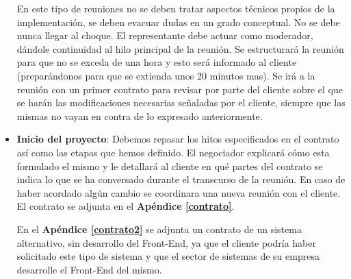 \begin{itemize}
    
En este tipo de reuniones no se deben tratar aspectos técnicos propios de la implementación, se deben evacuar dudas en un grado conceptual.
No se debe nunca llegar al choque. 
El representante debe actuar como moderador, dándole continuidad al hilo principal de la reunión.
Se estructurará la reunión para que no se exceda de una hora y esto será informado al cliente (preparándonos para que se extienda unos 20 minutos mas).
Se irá a la reunión con un primer contrato para revisar por parte del cliente sobre el que se harán las modificaciones necesarias señaladas por el cliente, siempre que las mismas no vayan en contra de lo expresado anteriormente.

	\item \textbf{Inicio del proyecto}:
    Debemos repasar los hitos especificados en el contrato así como las etapas que hemos definido. 
    El negociador explicará cómo esta formulado el mismo y le detallará al cliente en qué partes del contrato se indica lo que se ha conversado durante el transcurso de la reunión.
    En caso de haber acordado algún cambio se coordinara una nueva reunión con el cliente.
    El contrato se adjunta en el \textbf{Apéndice \ref{contrato}}.
    
    En el \textbf{Apéndice \ref{contrato2}} se adjunta un contrato de un sistema alternativo, sin desarrollo del Front-End, ya que el cliente podría haber solicitado este tipo de sistema y que el sector de sistemas de su empresa desarrolle el Front-End del mismo.
\end{itemize}
